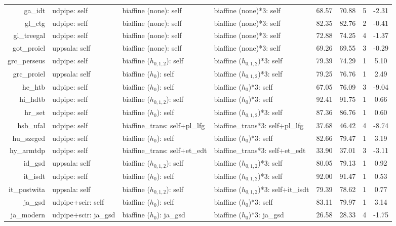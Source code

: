 \documentclass[11pt,a4paper]{article}
\begin{document}
\begin{table}[t]
\begin{tabular}{rlllcccc}
ga\_idt & udpipe: self & biaffine (none): self & biaffine (none)*3: self & 68.57 & 70.88 & 5 & -2.31 \\
gl\_ctg & udpipe: self & biaffine (none): self & biaffine (none)*3: self & 82.35 & 82.76 & 2 & -0.41 \\
gl\_treegal & udpipe: self & biaffine (none): self & biaffine (none)*3: self & 72.88 & 74.25 & 4 & -1.37 \\
got\_proiel & uppsala: self & biaffine (none): self & biaffine (none)*3: self & 69.26 & 69.55 & 3 & -0.29 \\
grc\_perseus & udpipe: self & biaffine ($h_{0,1,2}$): self & biaffine ($h_{0,1,2}$)*3: self & 79.39 & 74.29 & 1 & 5.10 \\
grc\_proiel & uppsala: self & biaffine ($h_{0}$): self & biaffine ($h_{0,1,2}$)*3: self & 79.25 & 76.76 & 1 & 2.49 \\
he\_htb & udpipe: self & biaffine ($h_{0}$): self & biaffine ($h_{0}$)*3: self & 67.05 & 76.09 & 3 & -9.04 \\
hi\_hdtb & udpipe: self & biaffine ($h_{0,1,2}$): self & biaffine ($h_{0}$)*3: self & 92.41 & 91.75 & 1 & 0.66 \\
hr\_set & udpipe: self & biaffine ($h_{0}$): self & biaffine ($h_{0,1,2}$)*3: self & 87.36 & 86.76 & 1 & 0.60 \\
hsb\_ufal & udpipe: self & biaffine\_trans: self+pl\_lfg & biaffine\_trans*3: self+pl\_lfg & 37.68 & 46.42 & 4 & -8.74 \\
hu\_szeged & udpipe: self & biaffine ($h_{0}$): self & biaffine ($h_{0}$)*3: self & 82.66 & 79.47 & 1 & 3.19 \\
hy\_armtdp & udpipe: self & biaffine\_trans: self+et\_edt & biaffine\_trans*3: self+et\_edt & 33.90 & 37.01 & 3 & -3.11 \\
id\_gsd & uppsala: self & biaffine ($h_{0,1,2}$): self & biaffine ($h_{0,1,2}$)*3: self & 80.05 & 79.13 & 1 & 0.92 \\
it\_isdt & udpipe: self & biaffine ($h_{0}$): self & biaffine ($h_{0,1,2}$)*3: self & 92.00 & 91.47 & 1 & 0.53 \\
it\_postwita & uppsala: self & biaffine ($h_{0,1,2}$): self & biaffine ($h_{0,1,2}$)*3: self+it\_isdt & 79.39 & 78.62 & 1 & 0.77 \\
ja\_gsd & udpipe+scir: self & biaffine ($h_{0}$): self & biaffine ($h_{0}$)*3: self & 83.11 & 79.97 & 1 & 3.14 \\
ja\_modern & udpipe+scir: ja\_gsd & biaffine ($h_{0}$): ja\_gsd & biaffine ($h_{0}$)*3: ja\_gsd & 26.58 & 28.33 & 4 & -1.75 \\

\end{tabular}
\end{table}
\end{document}

